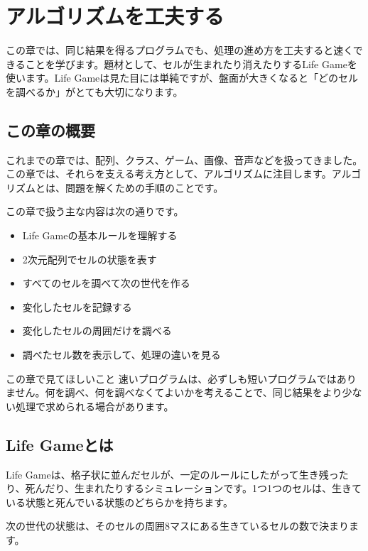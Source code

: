 \chapter{アルゴリズムを工夫する}
\label{chap:algorithm-improvement}

この章では、同じ結果を得るプログラムでも、処理の進め方を工夫すると速くできることを学びます。題材として、セルが生まれたり消えたりするLife Gameを使います。Life Gameは見た目には単純ですが、盤面が大きくなると「どのセルを調べるか」がとても大切になります。

\section{この章の概要}

これまでの章では、配列、クラス、ゲーム、画像、音声などを扱ってきました。この章では、それらを支える考え方として、アルゴリズムに注目します。アルゴリズムとは、問題を解くための手順のことです。

この章で扱う主な内容は次の通りです。

\begin{itemize}
    \item Life Gameの基本ルールを理解する
    \item 2次元配列でセルの状態を表す
    \item すべてのセルを調べて次の世代を作る
    \item 変化したセルを記録する
    \item 変化したセルの周囲だけを調べる
    \item 調べたセル数を表示して、処理の違いを見る
\end{itemize}

\begin{pointbox}{この章で見てほしいこと}
速いプログラムは、必ずしも短いプログラムではありません。何を調べ、何を調べなくてよいかを考えることで、同じ結果をより少ない処理で求められる場合があります。
\end{pointbox}

\section{Life Gameとは}

Life Gameは、格子状に並んだセルが、一定のルールにしたがって生き残ったり、死んだり、生まれたりするシミュレーションです。1つ1つのセルは、生きている状態と死んでいる状態のどちらかを持ちます。

次の世代の状態は、そのセルの周囲8マスにある生きているセルの数で決まります。


